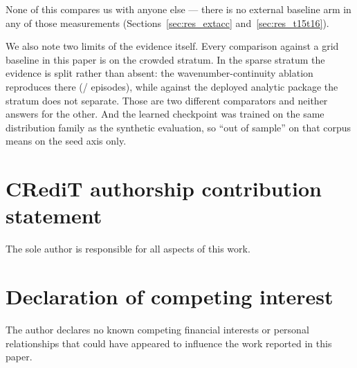 \documentclass[review]{elsarticle}
\begin{document}
None of this compares us with anyone else --- there is no external
baseline arm in any of those measurements (Sections~\ref{sec:res_extacc}
and~\ref{sec:res_t15t16}).

We also note two limits of the evidence itself. Every comparison against a grid
baseline in this paper is on the crowded stratum. In the sparse stratum the evidence
is split rather than absent: the wavenumber-continuity ablation reproduces there
(\BNineteenBetter{}/\BNineteenN{} episodes), while against the deployed analytic
package the stratum does not separate. Those are two different comparators and
neither answers for the other.
And the learned checkpoint was trained on the same distribution family
as the synthetic evaluation, so ``out of sample'' on that corpus means on the seed
axis only.


\section*{CRediT authorship contribution statement}

The sole author is responsible for all aspects of this work.

\section*{Declaration of competing interest}

The author declares no known competing financial interests or
personal relationships that could have appeared to influence
the work reported in this paper.
\end{document}
